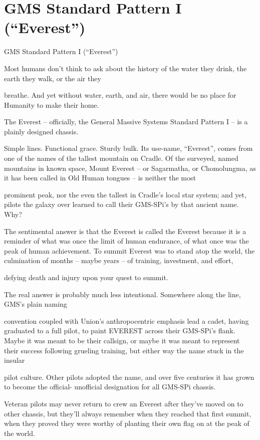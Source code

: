 \section{GMS Standard Pattern I (“Everest”)}

                                GMS Standard Pattern I (“Everest”)

Most humans don’t think to ask about the history of the water they drink, the earth they walk, or the air they

breathe. And yet without water, earth, and air, there would be no place for Humanity to make their home.

The Everest -- officially, the General Massive Systems Standard Pattern I -- is a plainly designed chassis.

Simple lines. Functional grace. Sturdy bulk. Its use-name, “Everest”, comes from one of the names of the
tallest mountain on Cradle. Of the surveyed, named mountains in known space, Mount Everest -- or
Sagarmatha, or Chomolungma, as it has been called in Old Human tongues -- is neither the most

prominent peak, nor the even the tallest in Cradle’s local star system; and yet, pilots the galaxy over learned
to call their GMS-SPi’s by that ancient name. Why?

The sentimental answer is that the Everest is called the Everest because it is a reminder of what was once
the limit of human endurance, of what once was the peak of human achievement. To summit Everest was
to stand atop the world, the culmination of months -- maybe years -- of training, investment, and effort,

defying death and injury upon your quest to summit.

The real answer is probably much less intentional. Somewhere along the line, GMS’s plain naming

convention coupled with Union’s anthropocentric emphasis lead a cadet, having graduated to a full pilot, to
paint EVEREST across their GMS-SPi’s flank. Maybe it was meant to be their callsign, or maybe it was
meant to represent their success following grueling training, but either way the name stuck in the insular

pilot culture. Other pilots adopted the name, and over five centuries it has grown to become the official-
unofficial designation for all GMS-SPi chassis.

Veteran pilots may never return to crew an Everest after they’ve moved on to other chassis, but they’ll
always remember when they reached that first summit, when they proved they were worthy of planting their
own flag on at the peak of the world.

